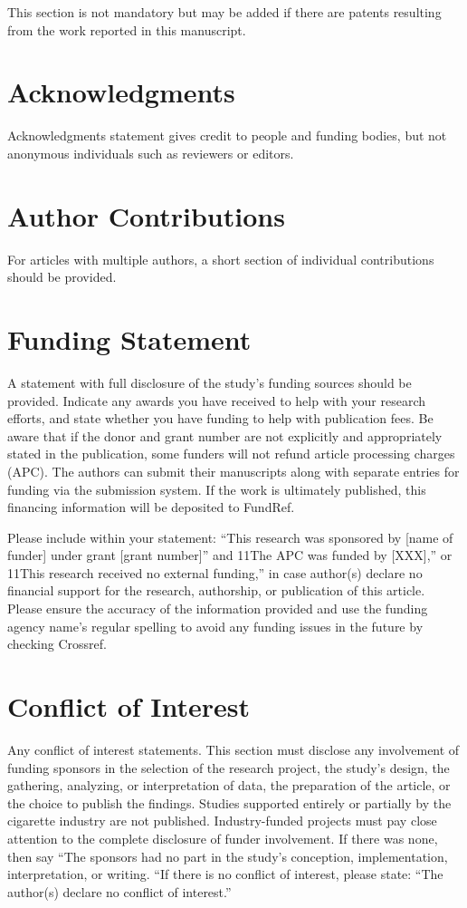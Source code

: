 \documentclass[12pt]{Definitions/academia}
\begin{document}
This section is not mandatory but may be added if there are patents resulting from the work reported in this manuscript.


\section*{Acknowledgments}

Acknowledgments statement gives credit to people and funding bodies, but not anonymous individuals such as reviewers or editors.

\section*{Author Contributions}

For articles with multiple authors, a short section of individual contributions should be provided.


\section*{Funding Statement}

A statement with full disclosure of the study's funding sources should be provided. Indicate any awards you have received to help with your research efforts, and state whether you have funding to help with publication fees. Be aware that if the donor and grant number are not explicitly and appropriately stated in the publication, some funders will not refund article processing charges (APC). The authors can submit their manuscripts along with separate entries for funding via the submission system. If the work is ultimately published, this financing information will be deposited to FundRef.

Please include within your statement: ``This research was sponsored by [name of funder] under grant [grant number]'' and 11The APC was funded by [XXX],'' or 11This research received no external funding,'' in case author(s) declare no financial support for the research, authorship, or publication of this article. Please ensure the accuracy of the information provided and use the funding agency name's regular spelling to avoid any funding issues in the future by checking Crossref.


\section*{Conflict of Interest}

Any conflict of interest statements. This section must disclose any involvement of funding sponsors in the selection of the research project, the study's design, the gathering, analyzing, or interpretation of data, the preparation of the article, or the choice to publish the findings. Studies supported entirely or partially by the cigarette industry are not published. Industry-funded projects must pay close attention to the complete disclosure of funder involvement. If there was none, then say ``The sponsors had no part in the study's conception, implementation, interpretation, or writing. ``If there is no conflict of interest, please state: ``The author(s) declare no conflict of interest.''
\end{document}

